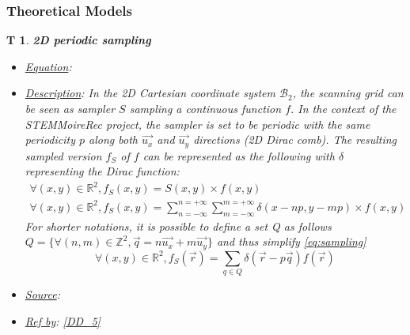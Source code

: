 \documentclass[12pt]{article}
\newcommand{\progname}{STEMMoireRec}
\newtheorem{T}{T}
\begin{document}
\subsubsection{Theoretical Models}\label{sec_theoretical}

\begin{T}
\label{T_1}
\noindent\colorbox{shadecolorT}{\normalfont \textbf{2D periodic sampling}}
\normalfont
\begin{itemize}
\item \underline{Equation}: 
\item \underline{Description}: In the 2D Cartesian coordinate system 
$\mathcal{B}_2$, the scanning grid can be seen as sampler $S$ sampling a 
continuous function $f$. In the context of the \progname{} project, the sampler 
is set to be periodic with the same periodicity $p$ along both 
$\overrightarrow{u_x}$ and $\overrightarrow{u_y}$ directions (2D Dirac comb). The resulting sampled version $f_S$ of 
$f$ can be represented as the following with $\delta$ representing the Dirac 
function:
\begin{equation}
\begin{gathered}
\forall (x,y) \in \mathbb{R}^{2}, f_S(x,y)=S(x,y)\times f(x,y) \\
\forall (x,y) \in \mathbb{R}^{2}, 
f_S(x,y)=\sum_{n=-\infty}^{n=+\infty}\sum_{m=-\infty}^{m=+\infty}\delta(x-np,y-mp)\times 
f(x,y)
\end{gathered}
\label{eq:sampling}
\end{equation}
For shorter notations, it is possible to define a set Q as follows $Q=\{\forall 
(n,m) \in \mathbb{Z}^{2}, \vec{q}=n\vec{u_x}+m\vec{u_y}\}$ and thus simplify 
\cref{eq:sampling}
\begin{equation}
\forall (x,y) \in \mathbb{R}^{2}, f_S(\vec{r})=\sum_{q\in 
Q}\delta(\vec{r}-p\vec{q}) f(\vec{r})
\label{eq:sampling_simplified}
\end{equation}
\item \underline{Source}: \cite{Gonzalez_1992}
\item \underline{Ref by}: \cref{DD_5}
\end{itemize}
\end{T}
\end{document}

